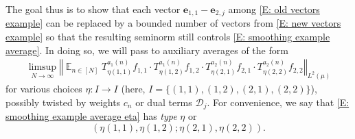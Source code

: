 \documentclass[11pt]{amsart}
\theoremstyle{definition}
\DeclareMathOperator*{\E}{\mathbb{E}}
\newcommand{\CD}{{\mathcal D}}
\newcommand{\be}{{\mathbf{e}}}
\newcommand{\bv}{{\mathbf{v}}}
\newcommand{\norm}[1]{\left\Vert #1\right\Vert}
\newcommand{\nnorm}[1]{\lvert\!|\!| #1|\!|\!\rvert}
\newcommand{\1}{{\mathbf{1}}}
\begin{document}
The goal thus is to show that each vector $\be_{1,1}-\be_{2,j}$ among \eqref{E: old vectors example} can be replaced by a bounded number of vectors from \eqref{E: new vectors example} so that the resulting seminorm still controls \eqref{E: smoothing example average}. In doing so, we will pass to auxiliary averages of the form
\begin{align}\label{E: smoothing example average eta}
        \limsup_{N\to\infty}\norm{\E_{n\in [N]} T_{\eta(1,1)}^{a_{1}(n)} f_{1,1}\cdot T_{\eta(1,2)}^{a_{1}(n)} f_{1,2}\cdot T_{\eta(2,1)}^{a_{2}(n)} f_{2,1}\cdot T_{\eta(2,2)}^{a_{2}(n)} f_{2,2}}_{L^2(\mu)}
\end{align}
for various choices $\eta: I\to I$ (here, $I = \{(1,1), (1,2), (2,1), (2,2)\}$), possibly twisted by weights $c_n$ or dual terms $\CD_j$. For convenience, we say that \eqref{E: smoothing example average eta} has \textit{type} $\eta$
or $$(\eta(1,1),\eta(1,2);\eta(2,1),\eta(2,2)).$$

\end{document}
